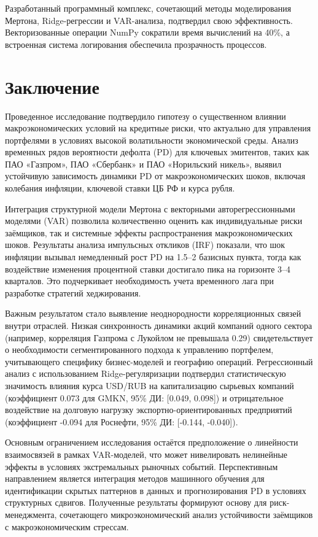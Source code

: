 \documentclass[]{article}
\begin{document}
	Разработанный программный комплекс, сочетающий методы моделирования Мертона, Ridge-регрессии и VAR-анализа, подтвердил свою эффективность. Векторизованные операции NumPy сократили время вычислений на 40\%, а встроенная система логирования обеспечила прозрачность процессов. 

	
	\section{Заключение}
	
	Проведенное исследование подтвердило гипотезу о существенном влиянии макроэкономических условий на кредитные риски, что актуально для управления портфелями в условиях высокой волатильности экономической среды. Анализ временных рядов вероятности дефолта (PD) для ключевых эмитентов, таких как ПАО «Газпром», ПАО «Сбербанк» и ПАО «Норильский никель», выявил устойчивую зависимость динамики PD от макроэкономических шоков, включая колебания инфляции, ключевой ставки ЦБ РФ и курса рубля.
	
	Интеграция структурной модели Мертона с векторными авторегрессионными моделями (VAR) позволила количественно оценить как индивидуальные риски заёмщиков, так и системные эффекты распространения макроэкономических шоков. Результаты анализа импульсных откликов (IRF) показали, что шок инфляции вызывал немедленный рост PD на 1.5–2 базисных пункта, тогда как воздействие изменения процентной ставки достигало пика на горизонте 3–4 кварталов. Это подчеркивает необходимость учета временного лага при разработке стратегий хеджирования.  
	
	Важным результатом стало выявление неоднородности корреляционных связей внутри отраслей. Низкая синхронность динамики акций компаний одного сектора (например, корреляция Газпрома с Лукойлом не превышала 0.29) свидетельствует о необходимости сегментированного подхода к управлению портфелем, учитывающего специфику бизнес-моделей и географию операций. Регрессионный анализ с использованием Ridge-регуляризации подтвердил статистическую значимость влияния курса USD/RUB на капитализацию сырьевых компаний (коэффициент 0.073 для GMKN, 95\% ДИ: [0.049, 0.098]) и отрицательное воздействие на долговую нагрузку экспортно-ориентированных предприятий (коэффициент -0.094 для Роснефти, 95\% ДИ: [-0.144, -0.040]).  
	
	Основным ограничением исследования остаётся предположение о линейности взаимосвязей в рамках VAR-моделей, что может нивелировать нелинейные эффекты в условиях экстремальных рыночных событий. Перспективным направлением является интеграция методов машинного обучения для идентификации скрытых паттернов в данных и прогнозирования PD в условиях структурных сдвигов. Полученные результаты формируют основу для риск-менеджмента, сочетающего микроэкономический анализ устойчивости заёмщиков с макроэкономическим стрессам.
	
\end{document}

